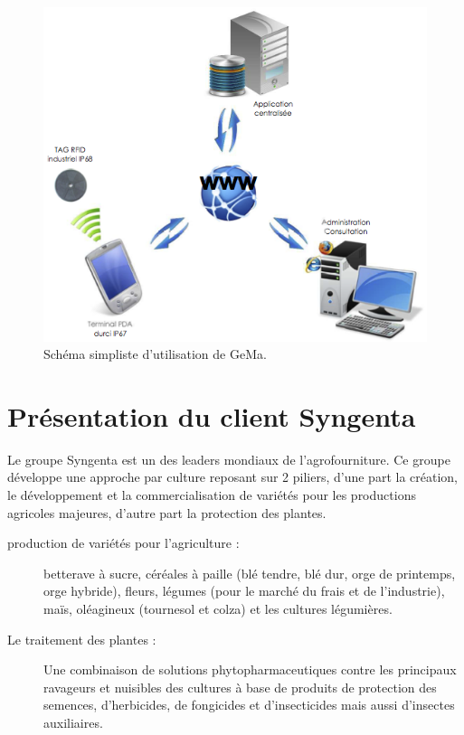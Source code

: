 \begin{figure}
  \begin{center}
    \includegraphics{images/gema.png}
    \caption{Schéma simpliste d'utilisation de GeMa.}
    \label{workflow}
  \end{center}
\end{figure}

\section{Présentation du client Syngenta} %
\label{sec:Présentation du client Syngenta}

Le groupe Syngenta est un des leaders mondiaux de l’agrofourniture.
Ce groupe développe une approche par culture reposant sur 2 piliers,
d'une part la création, le développement et la commercialisation de
variétés pour les productions agricoles majeures, d'autre part la
protection des plantes.

\begin{description}

  \item[production de variétés pour l'agriculture :] betterave à sucre,
    céréales à paille (blé tendre, blé dur, orge de printemps, orge
    hybride), fleurs, légumes (pour le marché du frais et de
    l’industrie), maïs, oléagineux (tournesol et colza) et les cultures
    légumières.

  \item[Le traitement des plantes :] Une combinaison de solutions
    phytopharmaceutiques contre les principaux ravageurs et nuisibles
    des cultures à base de produits de protection des semences,
    d’herbicides, de fongicides et d’insecticides mais aussi d’insectes
    auxiliaires.

\end{description}

